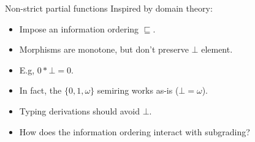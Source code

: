 \documentclass[fleqn]{beamer}
\begin{document}
\begin{frame}{Non-strict partial functions}
  Inspired by domain theory:
  \begin{itemize}
    \item Impose an information ordering $\sqsubseteq$.
    \item Morphisms are monotone, but don't preserve $\bot$ element.
    \item E.g, $0 * \bot = 0$.
    \item In fact, the $\{0,1,\omega\}$ semiring works as-is ($\bot = \omega$).
      \pause
    \item Typing derivations should avoid $\bot$.
    \item How does the information ordering interact with subgrading?
  \end{itemize}
\end{frame}
\end{document}
